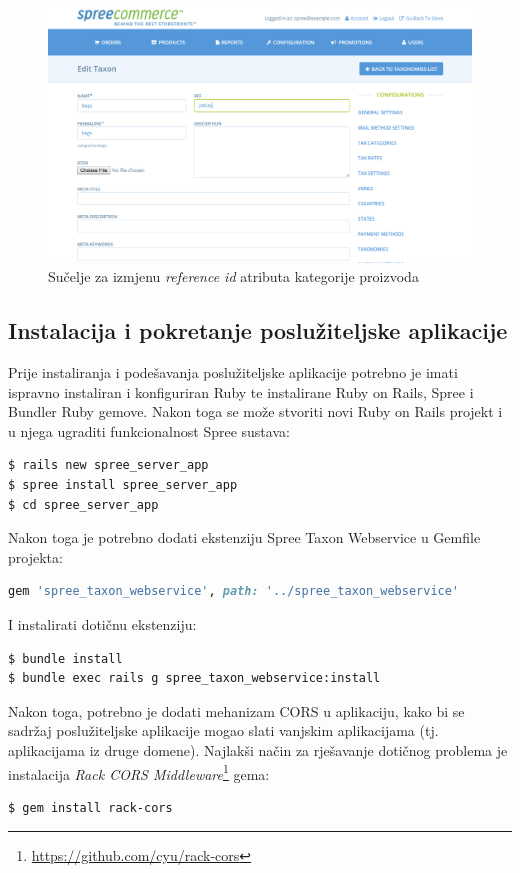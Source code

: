 \begin{figure}[H]
    \centering
    \includegraphics[scale=0.37]{pictures/spree_taxon_webservice}
    \caption{Sučelje za izmjenu \textit{reference id} atributa kategorije proizvoda}
\end{figure}

\subsection{Instalacija i pokretanje poslužiteljske aplikacije}

Prije instaliranja i podešavanja poslužiteljske aplikacije potrebno je imati ispravno instaliran i konfiguriran Ruby te instalirane Ruby on Rails, Spree i Bundler Ruby gemove. 
Nakon toga se može stvoriti novi Ruby on Rails projekt i u njega ugraditi funkcionalnost Spree sustava:
\begin{lstlisting}[language=bash]
$ rails new spree_server_app
$ spree install spree_server_app
$ cd spree_server_app
\end{lstlisting}

Nakon toga je potrebno dodati ekstenziju Spree Taxon Webservice u Gemfile projekta:
\begin{lstlisting}[language=ruby]
gem 'spree_taxon_webservice', path: '../spree_taxon_webservice'
\end{lstlisting}

I instalirati dotičnu ekstenziju:
\begin{lstlisting}[language=bash]
$ bundle install
$ bundle exec rails g spree_taxon_webservice:install
\end{lstlisting}

Nakon toga, potrebno je dodati mehanizam CORS  u aplikaciju, kako bi se sadržaj poslužiteljske aplikacije mogao slati vanjskim aplikacijama (tj. aplikacijama iz druge domene). 
Najlakši način za rješavanje dotičnog problema je instalacija \textit{Rack CORS Middleware}\footnote{\url{https://github.com/cyu/rack-cors}} gema:
\begin{lstlisting}[language=bash]
$ gem install rack-cors
\end{lstlisting}

